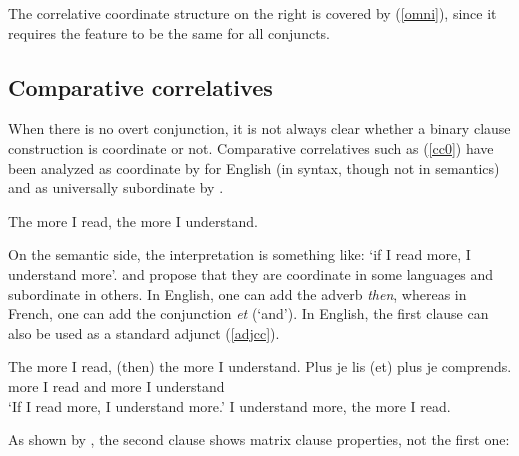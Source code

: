 {The correlative coordinate structure on the right is covered by (\ref{omni}), since it requires the \coord feature to be the same for all conjuncts. 



\subsection{Comparative correlatives}



When there is no overt conjunction, it is not always clear whether a binary clause construction is coordinate or not. Comparative correlatives such as (\ref{cc0}) have been analyzed as coordinate by \citet{culijack} for English (in syntax, though not in semantics) and as universally subordinate  by \citet{dikken}. 

\begin{exe}
\ex The more I read, the more I understand. \label{cc0}
\end{exe}

On the semantic side, the interpretation is something like: `if I read more, I understand
more'. \citet{Abeille:06} and \citet{Abeille:Borsley:08} propose that they are  coordinate in some languages 
 and subordinate in others. In English, one can add the adverb \emph{then}, whereas in French, one can add the conjunction \emph{et} (`and'). In English, the first clause can also be used as a standard adjunct (\ref{adjcc}).
 
 \begin{exe}
 \ex
\begin{xlista}
\ex The more I read, (then) the more I understand.
\ex 
\gll Plus je lis (et) plus je comprends.\\
     more I read and more I understand\\
\glt `If I read more, I understand more.'
\ex I understand more, the more I read.
\end{xlista}\label{adjcc}
\end{exe}

As shown by \citet[549--550]{culijack}, the second clause shows matrix clause properties, not the first one:

\begin{exe}
 \ex
\begin{xlista}
\end{xlista}
\end{exe}

}
